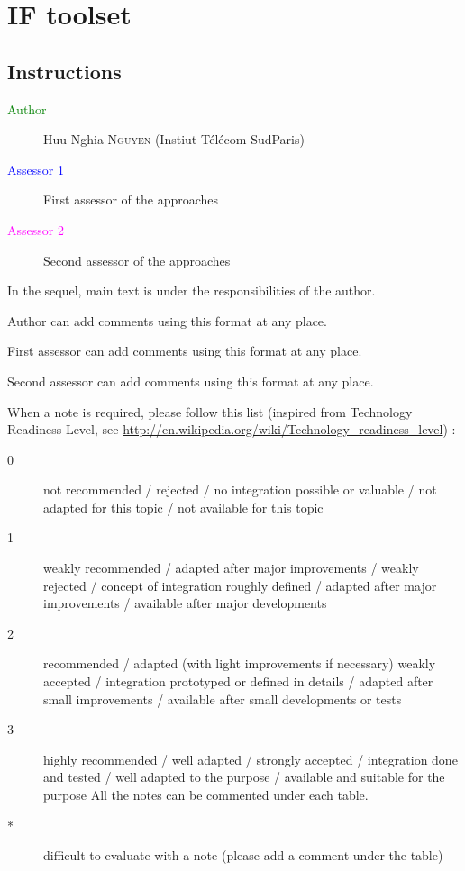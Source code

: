 \chapter{IF toolset}
\label{sec:if}

\section{Instructions}

\begin{description}
\item[\textcolor{green}{Author}]  Huu Nghia \textsc{Nguyen} (Instiut T\'el\'ecom-SudParis)
\item[\textcolor{blue}{Assessor 1}] First assessor of the approaches 
\item[\textcolor{magenta}{Assessor 2}] Second assessor of the approaches 
\end{description}

In the sequel, main text is under the responsibilities of the author.

\begin{author_comment}
Author can add comments using this format at any place.
\end{author_comment}

\begin{assessor1}
First assessor can add comments using this format at any place.
\end{assessor1}

\begin{assessor2}
Second assessor can add comments using this format at any place.
\end{assessor2}

When a note is required, please follow this list (inspired from Technology Readiness Level, see \url{http://en.wikipedia.org/wiki/Technology\_readiness\_level}) :

\begin{description}
\item[0] not recommended / rejected / no integration possible or valuable / not adapted for this topic / not available for this topic
\item[1] weakly recommended / adapted after major improvements / weakly rejected / concept of integration roughly defined / adapted after major improvements / available after major developments
\item[2] recommended / adapted (with light improvements if necessary)  weakly accepted / integration prototyped or defined in details / adapted after small improvements / available after small developments or tests
\item[3] highly recommended / well adapted / strongly accepted / integration done and tested / well adapted to the purpose / available and suitable for the purpose All the notes can be commented under each table.
\item[*] difficult to evaluate with a note (please add a comment under the table)
\end{description}


